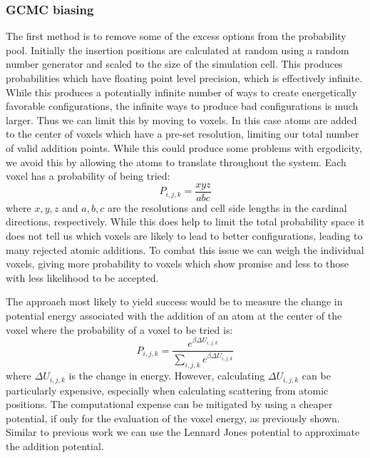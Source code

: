 \subsubsection{GCMC biasing}
The first method is to remove some of the excess options from the probability pool.
Initially the insertion positions are calculated at random using a random number generator and scaled to the size of the simulation cell.
This produces probabilities which have floating point level precision, which is effectively infinite.
While this produces a potentially infinite number of ways to create energetically favorable configurations, the infinite ways to produce bad configurations is much larger.
Thus we can limit this by moving to voxels.
In this case atoms are added to the center of voxels which have a pre-set resolution, limiting our total number of valid addition points.
While this could produce some problems with ergodicity, we avoid this by allowing the atoms to translate throughout the system.
Each voxel has a probability of being tried:
\begin{equation}
  P_{i, j, k} = \frac{x y z}{a b c}
\end{equation}
where $x, y, z$ and $a, b, c$ are the resolutions and cell side lengths in the cardinal directions, respectively.
While this does help to limit the total probability space it does not tell us which voxels are likely to lead to better configurations, leading to many rejected atomic additions.
To combat this issue we can weigh the individual voxels, giving more probability to voxels which show promise and less to those with less likelihood to be accepted.

The approach most likely to yield success would be to measure the change in potential energy associated with the addition of an atom at the center of the voxel where the probability of a voxel to be tried is:
\begin{equation}
  P_{i, j, k} = \frac{e^{\beta \Delta U_{i, j, k}}}{\sum_{i, j, k}e^{\beta \Delta U_{i, j, k}}}
\end{equation}
where $\Delta U_{i, j, k}$ is the change in energy.
However, calculating $\Delta U_{i, j, k}$ can be particularly expensive, especially when calculating scattering from atomic positions.
The computational expense can be mitigated by using a cheaper potential, if only for the evaluation of the voxel energy, as previously shown.
Similar to previous work we can use the Lennard Jones potential to approximate the addition potential.

